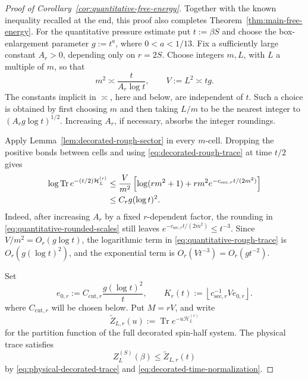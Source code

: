 \documentclass[11pt]{article}
\numberwithin{equation}{section}
\theoremstyle{remark}
\newcommand{\Tr}{\operatorname{Tr}}
\newcommand{\1}{\mathbf 1}
\begin{document}
\begin{proof}[Proof of Corollary~\ref{cor:quantitative-free-energy}]
Together with the known inequality recalled at the end, this proof also
completes Theorem~\ref{thm:main-free-energy}.
For the quantitative pressure estimate put \(t:=\beta S\) and choose the
box-enlargement parameter \(g:=t^a\), where \(0<a<1/13\).  Fix a
sufficiently large constant \(A_r>0\), depending only on \(r=2S\).
Choose integers \(m,L\), with \(L\) a multiple of \(m\), so that
\begin{equation}
 m^2\asymp \frac{t}{A_r\log t},
 \qquad V:=L^2\asymp tg.
 \label{eq:quantitative-rounded-scales}
\end{equation}
The constants implicit in \(\asymp\), here and below, are independent of
\(t\).  Such a choice is obtained by first choosing \(m\) and then taking
\(L/m\) to be the nearest integer to
\((A_rg\log t)^{1/2}\).  Increasing \(A_r\), if necessary, absorbs the
integer roundings.

Apply Lemma~\ref{lem:decorated-rough-sector} in every \(m\)-cell.
Dropping the positive bonds between cells and using
\eqref{eq:decorated-rough-trace} at time \(t/2\) gives
\begin{align}
 \log\Tr e^{-(t/2)\mathcal H_L^{(r)}}
 &\leq\frac{V}{m^2}
 \left[\log(rm^2+1)+rm^2
 e^{-c_{\mathrm{sec},r}t/(2m^2)}\right]\notag\\
 &\leq C_rg(\log t)^2.
 \label{eq:quantitative-rough-trace}
\end{align}
Indeed, after increasing \(A_r\) by a fixed \(r\)-dependent factor, the
rounding in \eqref{eq:quantitative-rounded-scales} still leaves
\(e^{-c_{\mathrm{sec},r}t/(2m^2)}\leq t^{-3}\).  Since
\(V/m^2=O_r(g\log t)\), the logarithmic term in
\eqref{eq:quantitative-rough-trace} is \(O_r(g(\log t)^2)\), and the
exponential term is \(O_r(Vt^{-3})=O_r(gt^{-2})\).

Set
\begin{equation}
 e_{0,r}:=C_{\mathrm{cut},r}\frac{g(\log t)^2}{t},
 \qquad
 K_r(t):=\left\lfloor c_{\mathrm{sec},r}^{-1}Ve_{0,r}\right\rfloor.
 \label{eq:quantitative-cutoffs}
\end{equation}
where \(C_{\mathrm{cut},r}\) will be chosen below.  Put \(M=rV\), and
write
\[
 \widetilde Z_{L,r}(u):=\Tr e^{-u\mathcal H_L^{(r)}}
\]
for the partition function of the full decorated spin-half system.  The
physical trace satisfies
\begin{equation}
 Z_L^{(S)}(\beta)\leq\widetilde Z_{L,r}(t)
 \label{eq:physical-below-decorated-trace}
\end{equation}
by \eqref{eq:physical-decorated-trace} and
\eqref{eq:decorated-time-normalization}.


\end{proof}
\end{document}
